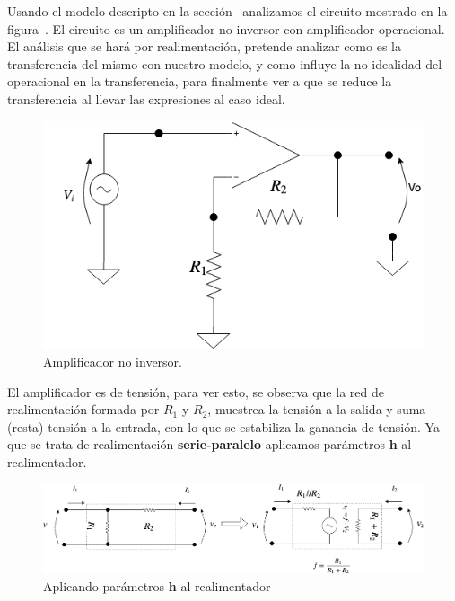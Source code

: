 Usando el modelo descripto en la sección~ analizamos el circuito mostrado en la figura~. El circuito es un amplificador no inversor con amplificador operacional. El análisis que se hará por realimentación, pretende analizar como es la transferencia del mismo con nuestro modelo, y como influye la no idealidad del operacional en la transferencia, para finalmente ver a que se reduce la transferencia al llevar las expresiones al caso ideal.

\begin{figure}[H] %
\begin{center}
\includegraphics[width=0.5 \textwidth, angle=0]{./img/operacionales/OP_NINV.png}
\caption{\label{fig:fig_operational_ideal_non_inverter}\footnotesize{Amplificador no inversor.}}
\end{center}
\end{figure}


El amplificador es de tensión, para ver esto, se observa que la red de realimentación formada por $R_{1}$ y $R_{2}$, muestrea la tensión a la salida y suma (resta) tensión a la entrada, con lo que se estabiliza la ganancia de tensión. Ya que se trata de realimentación \textbf{serie-paralelo} aplicamos parámetros \textbf{h} al realimentador.



\begin{figure}[H] %
\begin{center}
\includegraphics[width=0.9 \textwidth, angle=0]{./img/operacionales/OP_NINV_FEEDBACK.png}
\caption{\label{fig:fig_ninv_feedback}\footnotesize{Aplicando parámetros \textbf{h} al realimentador}}
\end{center}
\end{figure}



